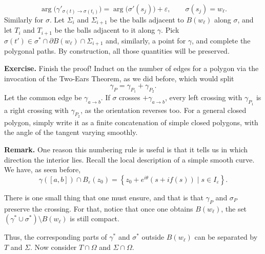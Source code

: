 \documentclass[11pt,a4paper]{article}
\begin{document}
\[
  \arg\bigl(\gamma'_{\sigma(t)\to\sigma(t_i)}\bigr)
  =\arg\bigl(\sigma'(s_j)\bigr)+\varepsilon,
  \qquad \sigma(s_j)=w_\ell.
\]
Similarly for \(\sigma\). Let \(\Sigma_i\) and \(\Sigma_{i+1}\) be the balls adjacent to \(B(w_\ell)\) along \(\sigma\), and let \(T_i\) and \(T_{i+1}\) be the balls adjacent to it along \(\gamma\). Pick \(\sigma(t')\in\sigma^*\cap\partial B(w_\ell)\cap\Sigma_{i+1}\)
and, similarly, a point for \(\gamma\), and complete the polygonal paths. By construction, all those quantities will be preserved.

\textbf{Exercise.}
Finish the proof! Induct on the number of edges for a polygon via the invocation of the Two-Ears Theorem, as we did before, which would split
\[
  \gamma_P=\gamma_{P_1}+\gamma_{P_2}.
\]
Let the common edge be \(\gamma_{a\to b}\). If \(\sigma\) crosses \(+\gamma_{a\to b}\), every left crossing with \(\gamma_{P_1}\) is a right crossing with \(\gamma_{P_2}\), as the orientation reverses too. For a general closed polygon, simply write it as a finite concatenation of simple closed polygons, with the angle of the tangent varying smoothly.

\textbf{Remark.}
One reason this numbering rule is useful is that it tells us in which direction the interior lies. Recall the local description of a simple smooth curve. We have, as seen before,
\[
  \gamma([a,b])\cap B_\varepsilon(z_0)
  =\left\{z_0+e^{i\theta}(s+if(s))\mid s\in I_\varepsilon\right\}.
\]


There is one small thing that one must ensure, and that is that \(\gamma_P\) and \(\sigma_P\) preserve the crossing. For that, notice that once one obtains \(B(w_\ell)\), the set \((\gamma^*\cup\sigma^*)\setminus B(w_\ell)\)
is still compact.

Thus, the corresponding parts of \(\gamma^*\) and \(\sigma^*\) outside \(B(w_\ell)\) can be separated by \(T\) and \(\Sigma\). Now consider \(T\cap\Omega\) and \(\Sigma\cap\Omega\).

\end{document}
